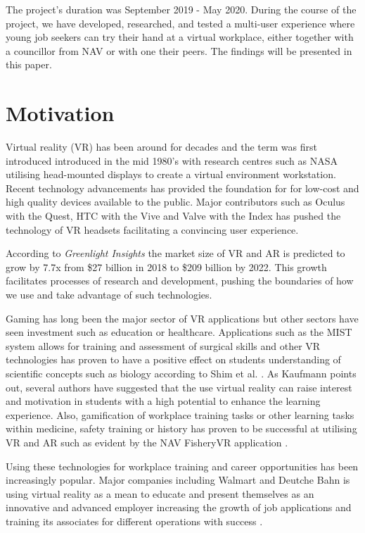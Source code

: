 The project's duration was September 2019 - May 2020. During the course of the project, we have developed, researched, and tested a multi-user experience where young job seekers can try their hand at a virtual workplace, either together with a councillor from NAV or with one their peers. The findings will be presented in this paper.

\section{Motivation}
Virtual reality (VR) has been around for decades and the term was first introduced introduced in the mid 1980's \cite{historyVR} with research centres such as NASA utilising head-mounted displays to create a virtual environment workstation. Recent technology advancements has provided the foundation for for low-cost and high quality devices available to the public. Major contributors such as Oculus with the Quest, HTC with the Vive and Valve with the Index has pushed the technology of VR headsets facilitating a convincing user experience.  

According to \textit{Greenlight Insights} \cite{forcastVR} the market size of VR and AR is predicted to grow by 7.7x from \$27 billion in 2018 to \$209 billion by 2022. This growth facilitates processes of research and development, pushing the boundaries of how we use and take advantage of such technologies.

Gaming has long been the major sector of VR applications but other sectors have seen investment such as education or healthcare. Applications such as the MIST system \cite{mccloy2001virtual} allows for training and assessment of surgical skills and other VR technologies has proven to have a positive effect on students understanding of scientific concepts such as biology according to Shim et al. \cite{shim2003application}. As Kaufmann \cite{kaufmann2003collaborative} points out, several authors have suggested that the use virtual reality can raise interest and motivation in students with a high potential to enhance the learning experience.
Also, gamification of workplace training tasks or other learning tasks within medicine, safety training or history has proven to be successful at utilising VR and AR such as evident by the NAV FisheryVR application \cite{fishfarmNAV}. 

Using these technologies for workplace training and career opportunities has been increasingly popular. Major companies including  Walmart and Deutche Bahn is using virtual reality as a mean to educate and present themselves as an innovative and advanced employer increasing the growth of job applications and training its associates for different operations with success \cite{vasilenko2019virtual}.    



